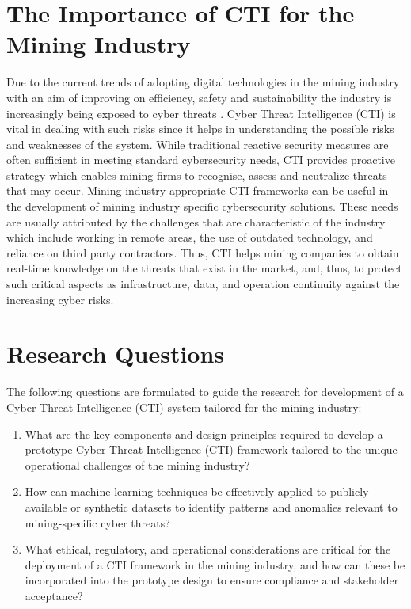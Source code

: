 \documentclass[a4paper,twoside,12pt]{report}
\begin{document}
\section{The Importance of CTI for the Mining Industry}
Due to the current trends of  adopting digital technologies in the mining industry with an aim of improving on efficiency, safety and sustainability the industry  is increasingly being exposed to cyber threats \citet{lenka2023cybersecurity}. Cyber  Threat Intelligence (CTI) is vital in dealing with such risks since it helps in understanding the possible  risks and weaknesses of the system. While traditional reactive security measures are often sufficient in meeting standard cybersecurity  needs, CTI provides proactive strategy which enables mining firms to recognise, assess and neutralize threats that may  occur. 
Mining industry appropriate CTI frameworks can be useful in the development of mining industry specific cybersecurity  solutions. These needs are usually attributed by the challenges that are characteristic of the industry which include working in  remote areas, the use of outdated technology, and reliance on third party contractors. Thus, CTI  helps mining companies to obtain real-time knowledge on the threats that exist in the market, and,  thus, to protect such critical aspects as infrastructure, data, and operation continuity against the increasing cyber risks.  
\section{Research Questions}

The following questions are formulated to guide the research for development of a Cyber Threat Intelligence (CTI) system tailored for the mining industry:

\begin{enumerate}
    \item {What are the key components and design principles required to develop a prototype Cyber Threat Intelligence (CTI) framework tailored to the unique operational challenges of the mining industry?}
    \item {How can machine learning techniques be effectively applied to publicly available or synthetic datasets to identify patterns and anomalies relevant to mining-specific cyber threats?}
    \item {What ethical, regulatory, and operational considerations are critical for the deployment of a CTI framework in the mining industry, and how can these be incorporated into the prototype design to ensure compliance and stakeholder acceptance?}
\end{enumerate}
\end{document}
